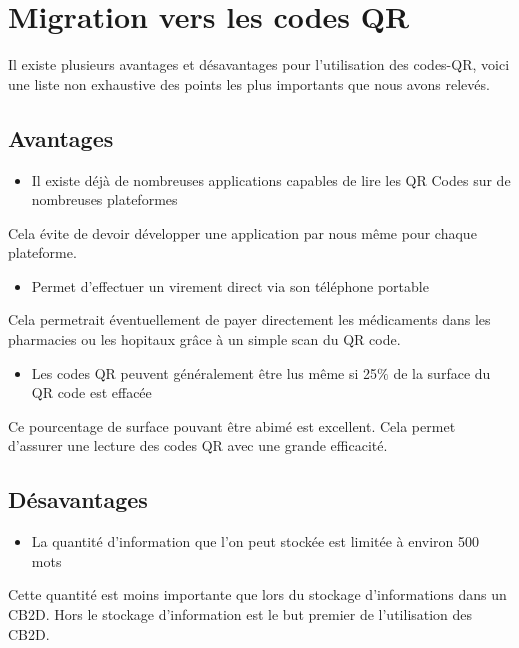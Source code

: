 \newpage

\section{Migration vers les codes QR}

Il existe plusieurs avantages et désavantages pour l'utilisation des codes-QR, voici une liste non exhaustive des points les plus importants que nous avons relevés.

\subsection{Avantages}

\begin{itemize}
\item Il existe déjà de nombreuses applications capables de lire les QR Codes sur de nombreuses plateformes
\end{itemize}
Cela évite de devoir développer une application par nous même pour chaque plateforme.

\begin{itemize}
\item Permet d'effectuer un virement direct via son téléphone portable
\end{itemize}
Cela permetrait éventuellement de payer directement les médicaments dans les pharmacies ou les hopitaux grâce à un simple scan du QR code.

\begin{itemize}
\item Les codes QR peuvent généralement être lus même si 25$\%$ de la surface du QR code est effacée
\end{itemize}
Ce pourcentage de surface pouvant être abimé est excellent. Cela permet d'assurer une lecture des codes QR avec une grande efficacité.


\subsection{Désavantages}

\begin{itemize}
\item La quantité d'information que l'on peut stockée est limitée à environ 500 mots
\end{itemize}
Cette quantité est moins importante que lors du stockage d'informations dans un CB2D. Hors le stockage d'information est le but premier de l'utilisation des CB2D.